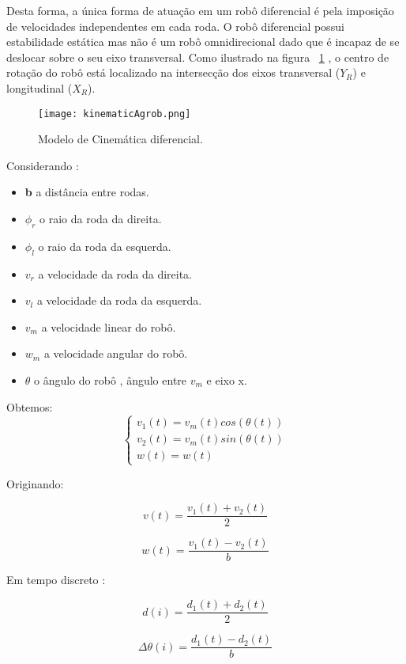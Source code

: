 Desta forma, a única forma de atuação em um robô diferencial é pela imposição de velocidades independentes em cada roda. O robô diferencial possui estabilidade estática mas não é um robô omnidirecional dado que é incapaz de se deslocar sobre o seu eixo transversal. Como ilustrado na figura ~\ref{fig:kinematicAgrob} , o centro de rotação do robô está localizado na intersecção dos eixos transversal (\textbf{$Y_R$}) e longitudinal (\textbf{$X_R$}).

\begin{figure}[h!] %
	\begin{center}
		\leavevmode		
		\texttt{[image: kinematicAgrob.png]}
		\caption{Modelo de Cinemática diferencial.}
		\label{fig:kinematicAgrob}
	\end{center}
\end{figure}


Considerando : 
\begin{itemize}
	\item \textbf{b} a distância entre rodas.
	\item \textbf{$\phi_r$} o raio da roda da direita.
	\item \textbf{$\phi_l$} o raio da roda da esquerda.
	\item \textbf{$v_r$} a velocidade da roda da direita.
	\item \textbf{$v_l$} a velocidade da roda da esquerda.
	\item \textbf{$v_m$} a velocidade linear do robô.
	\item \textbf{$w_m$} a velocidade angular do robô.
	\item $\textbf{$\theta$}$ o ângulo do robô , ângulo entre $v_m$ e eixo x.
\end{itemize}

Obtemos:
\[ \left\{\begin{array}{ccc}
v_1(t) = v_m(t) cos( \theta(t))\\ 
v_2(t) = v_m(t) sin( \theta(t))\\ 
w(t) = w(t)
\end{array}\right. \]

Originando: 

\[ v(t) = \frac{v_1(t)+v_2(t)}{2} \]

\[  w(t) = \frac{v_1(t)-v_2(t)}{b} \]

Em tempo discreto :

\[ d(i) = \frac{d_1(t)+d_2(t)}{2} \]

\[ \Delta \theta (i) = \frac{d_1(t)-d_2(t)}{b} \]

